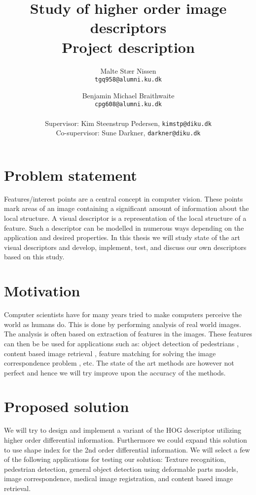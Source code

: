 \documentclass[11pt,a4paper]{article}
\title{\bfseries{Study of higher order image descriptors}\\Project description}
\author{
    Malte Stær Nissen \\\texttt{tgq958@alumni.ku.dk}
    \and
    Benjamin Michael Braithwaite \\ \texttt{cpg608@alumni.ku.dk}
    \\
    \\ \small{Supervisor: Kim Steenstrup Pedersen, \texttt{kimstp@diku.dk}}
    \\ \small{Co-supervisor: Sune Darkner, \texttt{darkner@diku.dk}}
    }
\begin{document}
\maketitle

\section{Problem statement}
Features/interest points are a central concept in computer vision. These
points mark areas of an image containing a significant amount of information
about the local structure. A visual descriptor is a representation of the
local structure of a feature. Such a descriptor can be modelled in numerous
ways depending on the application and desired properties. In this thesis we
will study state of the art visual descriptors and develop, implement, test,
and discuss our own descriptors based on this study.

\section{Motivation}
Computer scientists have for many years tried to make computers perceive the
world as humans do. This is done by performing analysis of real world images.
The analysis is often based on extraction of features in the images. These
features can then be be used for applications such as: object detection of
pedestrians \cite{felzenszwalb2008discriminatively},
content based image retrieval \cite{smeulders2000content},
feature matching for solving the image correspondence problem
\cite{dahl2011finding}, etc.
The state of the art methods are however
not perfect and hence we will try improve upon the accuracy of the methods.

\section{Proposed solution}
We will try to design and implement a variant of the HOG descriptor utilizing
higher order differential information. Furthermore we could expand this
solution to use shape index for the 2nd order differential information. We
will select a few of the following applications for testing our solution:
Texture recognition, pedestrian detection, general object detection using
deformable parts models, image correspondence, medical image registration, and
content based image retrieval.
\end{document}
